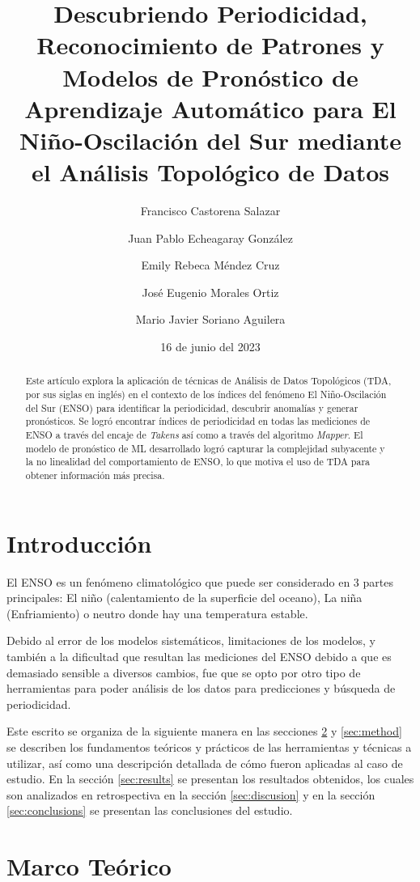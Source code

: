 \documentclass{article}
\author{\normalsize Francisco Castorena Salazar}
\author{\normalsize Juan Pablo Echeagaray González}
\author{\normalsize Emily Rebeca Méndez Cruz}
\author{\normalsize José Eugenio Morales Ortiz}
\author{\normalsize Mario Javier Soriano Aguilera}
\affil{Ing. en Ciencias de Datos y Matemáticas, Tec de Monterrey}
\title{\Large \bf Descubriendo Periodicidad, Reconocimiento de Patrones y Modelos de Pronóstico de Aprendizaje Automático para El Niño-Oscilación del Sur mediante el Análisis Topológico de Datos}
\date{\normalsize 16 de junio del 2023}
\begin{document}
    \maketitle
    \begin{abstract}
        Este artículo explora la aplicación de técnicas de Análisis de Datos Topológicos (TDA, por sus siglas en inglés) en el contexto de los índices del fenómeno El Niño-Oscilación del Sur (ENSO) para identificar la periodicidad, descubrir anomalías y generar pronósticos. Se logró encontrar índices de periodicidad en todas las mediciones de ENSO a través del encaje de \textit{Takens} así como a través del algoritmo \textit{Mapper}. El modelo de pronóstico de ML desarrollado logró capturar la complejidad subyacente y la no linealidad del comportamiento de ENSO, lo que motiva el uso de TDA para obtener información más precisa.
    \end{abstract}

    \section{Introducción}

        El ENSO es un fenómeno climatológico que puede ser considerado en 3 partes principales: El niño (calentamiento de la superficie del oceano), La niña (Enfriamiento) o neutro donde hay una temperatura estable.

        Debido al error de los modelos sistemáticos, limitaciones de los modelos, y también a la dificultad que resultan las mediciones del ENSO debido a que es demasiado sensible a diversos cambios, fue que se opto por otro tipo de herramientas para poder análisis de los datos para predicciones y búsqueda de periodicidad.

        Este escrito se organiza de la siguiente manera en las secciones \ref{sec:theory} y \ref{sec:method} se describen los fundamentos teóricos y prácticos de las herramientas y técnicas a utilizar, así como una descripción detallada de cómo fueron aplicadas al caso de estudio. En la sección \ref{sec:results} se presentan los resultados obtenidos, los cuales son analizados en retrospectiva en la sección \ref{sec:discusion} y en la sección \ref{sec:conclusions} se presentan las conclusiones del estudio.

    \section{Marco Teórico} \label{sec:theory}
\end{document}
